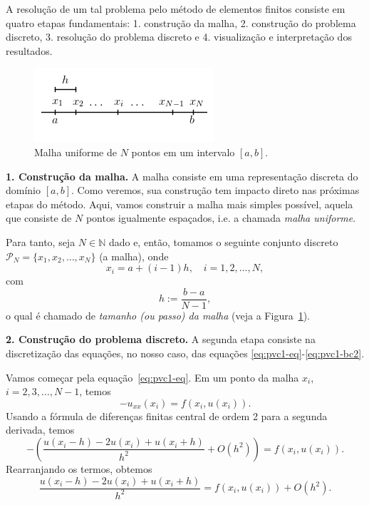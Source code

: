 A resolução de um tal problema pelo método de elementos finitos consiste em quatro etapas fundamentais: 1. construção da malha, 2. construção do problema discreto, 3. resolução do problema discreto e 4. visualização e interpretação dos resultados. 

\begin{figure}
  \centering
  \includegraphics{./cap_pvc/pics/malha_uniforme/malha_uniforme}
  \caption{Malha uniforme de $N$ pontos em um intervalo $[a, b]$.}
  \label{fig:malha_uniforme}
\end{figure}

{\bf 1. Construção da malha.} A malha consiste em uma representação discreta do domínio $[a, b]$. Como veremos, sua construção tem impacto direto nas próximas etapas do método. Aqui, vamos construir a malha mais simples possível, aquela que consiste de $N$ pontos igualmente espaçados, i.e. a chamada \emph{malha uniforme}.

Para tanto, seja $N\in\mathbb{N}$ dado e, então, tomamos o seguinte conjunto discreto $\mathcal{P}_N = \{x_1, x_2, \dotsc, x_N\}$ (a malha), onde
\begin{equation*}
  x_i = a + (i-1)h,\quad i=1, 2, \dotsc, N,
\end{equation*}
com
\begin{equation*}
  h:=\frac{b-a}{N-1},
\end{equation*}
o qual é chamado de \emph{tamanho (ou passo) da malha} (veja a Figura~\ref{fig:malha_uniforme}).

{\bf 2. Construção do problema discreto.} A segunda etapa consiste na discretização das equações, no nosso caso, das equações \eqref{eq:pvc1-eq}-\eqref{eq:pvc1-bc2}. 

Vamos começar pela equação~\eqref{eq:pvc1-eq}. Em um ponto da malha $x_i$, $i = 2, 3, \dotsc, N-1$, temos
\begin{equation*}
  -u_{xx}(x_i) = f(x_i, u(x_i)).
\end{equation*}
Usando a fórmula de diferenças finitas central de ordem 2 para a segunda derivada, temos
\begin{equation*}
  -\left(\frac{u(x_i-h) - 2u(x_i) + u(x_i+h)}{h^2} + O(h^2)\right) = f(x_i, u(x_i)).
\end{equation*}
Rearranjando os termos, obtemos
\begin{equation*}
  \frac{u(x_i-h) - 2u(x_i) + u(x_i+h)}{h^2} = f(x_i, u(x_i)) + O(h^2). 
\end{equation*}

